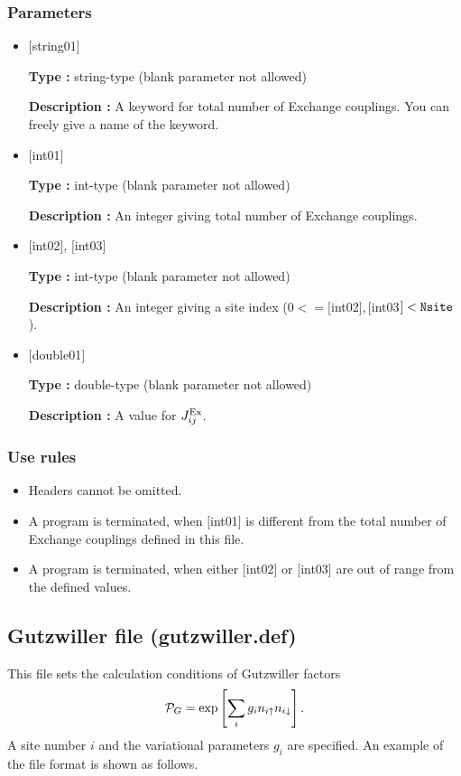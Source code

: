 \subsubsection{Parameters}
 \begin{itemize}

   \item  $[$string01$]$
   
    {\bf Type :} string-type (blank parameter not allowed)

   {\bf Description :}  A keyword for total number of Exchange couplings. You can freely give a name of the keyword.

   \item  $[$int01$]$
   
    {\bf Type :} int-type (blank parameter not allowed)

   {\bf Description :} An integer giving total number of Exchange couplings.

  \item  $[$int02$]$, $[$int03$]$
  
 {\bf Type :} int-type (blank parameter not allowed)

{\bf Description :} An integer giving a site index ($0<= [$int02$], [$int03$]<\verb|Nsite|$).
 
 \item  $[$double01$]$
   
   {\bf Type :} double-type (blank parameter not allowed)

  {\bf Description :}   A value for $J_{ij}^{\rm Ex}$.
  
\end{itemize}

\subsubsection{Use rules}
\begin{itemize}
\item Headers cannot be omitted. 
\item A program is terminated, when $[$int01$]$ is different from the total number of Exchange couplings defined in this file.
\item A program is terminated, when either $[$int02$]$ or $[$int03$]$ are out of range from the defined values.
\end{itemize}

\newpage
\subsection{Gutzwiller file (gutzwiller.def)}
\label{Subsec:Gutzwiller}
This file sets the calculation conditions of Gutzwiller factors 
\begin{equation}
{\cal P}_G=\exp\left[ \sum_i g_i n_{i\uparrow} n_{i\downarrow} \right].
\end{equation}
A site number $i$ and the variational parameters $g_i$ are specified.
An example of the file format is shown as follows.

